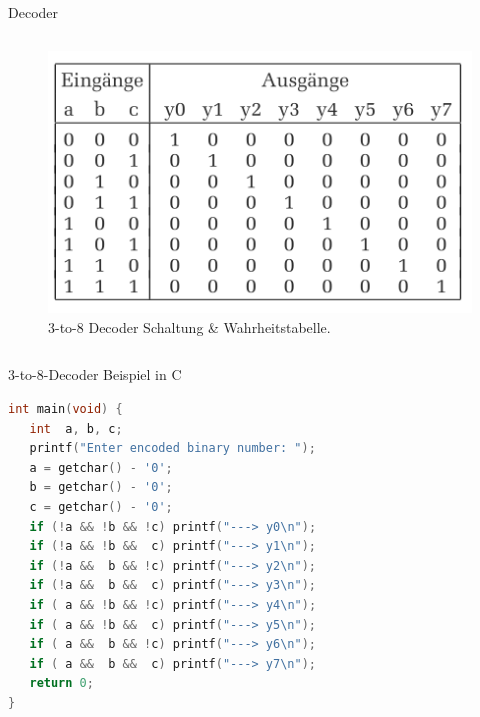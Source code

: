 \documentclass[12pt%
,xcolor=table
,aspectratio=169%
]{beamer}
\begin{document}
\begin{frame}{Decoder}
\begin{columns}[T]
\begin{column}{.48\textwidth}
\begin{figure}
\includegraphics[scale=0.3]{pictures/decoder2}
\caption{3-to-8 Decoder Schaltung \& Wahrheitstabelle.}
\end{figure}
\end{column}%
\end{columns}
\end{frame}

\begin{frame}[fragile]{3-to-8-Decoder Beispiel in C}
\begin{lstlisting}[language=C]
int main(void) {
   int  a, b, c;
   printf("Enter encoded binary number: ");
   a = getchar() - '0';
   b = getchar() - '0';
   c = getchar() - '0';
   if (!a && !b && !c) printf("---> y0\n");
   if (!a && !b &&  c) printf("---> y1\n");
   if (!a &&  b && !c) printf("---> y2\n");
   if (!a &&  b &&  c) printf("---> y3\n");
   if ( a && !b && !c) printf("---> y4\n");
   if ( a && !b &&  c) printf("---> y5\n");
   if ( a &&  b && !c) printf("---> y6\n");
   if ( a &&  b &&  c) printf("---> y7\n");
   return 0;
}
\end{lstlisting}
\end{frame}
\end{document}
